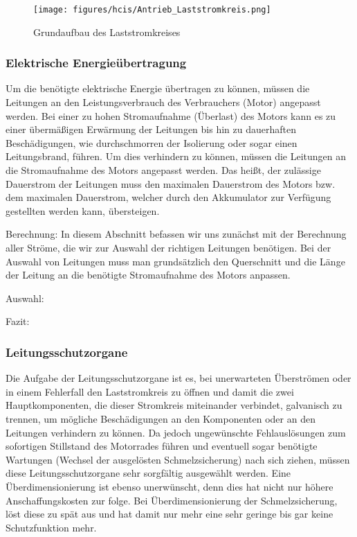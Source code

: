 \begin{figure}[H]
	\begin{center}
		\texttt{[image: figures/hcis/Antrieb\_Laststromkreis.png]}
		\caption{Grundaufbau des Laststromkreises}
	\end{center}
\end{figure}

\newpage



\subsubsection{Elektrische Energieübertragung}
Um die benötigte elektrische Energie übertragen zu können, müssen die Leitungen an den Leistungsverbrauch des Verbrauchers (Motor) angepasst werden. Bei einer zu hohen Stromaufnahme (Überlast) des Motors kann es zu einer übermäßigen Erwärmung der Leitungen bis hin zu dauerhaften Beschädigungen, wie durchschmorren der Isolierung oder sogar einen Leitungsbrand, führen. Um dies verhindern zu können, müssen die Leitungen an die Stromaufnahme des Motors angepasst werden. Das heißt, der zulässige Dauerstrom der Leitungen muss den maximalen Dauerstrom des Motors bzw. dem maximalen Dauerstrom, welcher durch den Akkumulator zur Verfügung gestellten werden kann, übersteigen.

Berechnung:
In diesem Abschnitt befassen wir uns zunächst mit der Berechnung aller Ströme, die wir zur Auswahl der richtigen Leitungen benötigen. Bei der Auswahl von Leitungen muss man grundsätzlich den Querschnitt und die Länge der Leitung an die benötigte Stromaufnahme des Motors anpassen.

Auswahl:

Fazit:

\newpage



\subsubsection{Leitungsschutzorgane}
Die Aufgabe der Leitungsschutzorgane ist es, bei unerwarteten Überströmen oder in einem Fehlerfall den Laststromkreis zu öffnen und damit die zwei Hauptkomponenten, die dieser Stromkreis miteinander verbindet, galvanisch zu trennen, um mögliche Beschädigungen an den Komponenten oder an den Leitungen verhindern zu können. Da jedoch ungewünschte Fehlauslösungen zum sofortigen Stillstand des Motorrades führen und eventuell sogar benötigte Wartungen (Wechsel der ausgelösten Schmelzsicherung) nach sich ziehen, müssen diese Leitungsschutzorgane sehr sorgfältig ausgewählt werden. Eine Überdimensionierung ist ebenso unerwünscht, denn dies hat nicht nur höhere Anschaffungskosten zur folge. Bei Überdimensionierung der Schmelzsicherung, löst diese zu spät aus und hat damit nur mehr eine sehr geringe bis gar keine Schutzfunktion mehr. 

